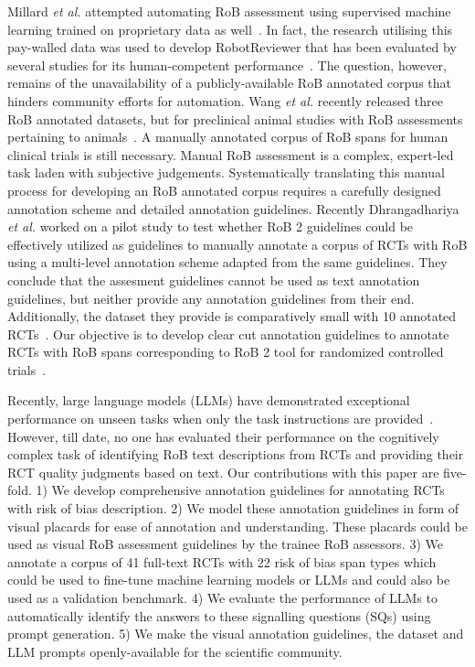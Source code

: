 \documentclass[sn-mathphys,Numbered]{sn-jnl}%
\theoremstyle{thmstyleone}%
\theoremstyle{thmstyletwo}%
\theoremstyle{thmstylethree}%
\begin{document}
Millard \textit{et al.} attempted automating RoB assessment using supervised machine learning trained on proprietary data as well~\cite{millard2016machine}.
In fact, the research utilising this pay-walled data was used to develop RobotReviewer that has been evaluated by several studies for its human-competent performance~\cite{marshall2016robotreviewer,soboczenski2019machine,vinkers2021methodological,jardim2022automating,hirt2021agreement}.
The question, however, remains of the unavailability of a publicly-available RoB annotated corpus that hinders community efforts for automation. 
Wang \textit{et al.} recently released three RoB annotated datasets, but for preclinical animal studies with RoB assessments pertaining to animals~\cite{wang2022risk}.
A manually annotated corpus of RoB spans for human clinical trials is still necessary.
Manual RoB assessment is a complex, expert-led task laden with subjective judgements.
Systematically translating this manual process for developing an RoB annotated corpus requires a carefully designed annotation scheme and detailed annotation guidelines.
Recently Dhrangadhariya \textit{et al.} worked on a pilot study to test whether RoB 2 guidelines could be effectively utilized as guidelines to manually annotate a corpus of RCTs with RoB using a multi-level annotation scheme adapted from the same guidelines.
They conclude that the assesment guidelines cannot be used as text annotation guidelines, but neither provide any annotation guidelines from their end.
Additionally, the dataset they provide is comparatively small with 10 annotated RCTs~\cite{dhrangadhariya2023first}.
Our objective is to develop clear cut annotation guidelines to annotate RCTs with RoB spans corresponding to RoB 2 tool for randomized controlled trials~\cite{sterne2019rob}.



Recently, large language models (LLMs) have demonstrated exceptional performance on unseen tasks when only the task instructions are provided~\cite{chang2023survey}.
However, till date, no one has evaluated their performance on the cognitively complex task of identifying RoB text descriptions from RCTs and providing their RCT quality judgments based on text.
Our contributions with this paper are five-fold. 
1) We develop comprehensive annotation guidelines for annotating RCTs with risk of bias description.
2) We model these annotation guidelines in form of visual placards for ease of annotation and understanding. These placards could be used as visual RoB assessment guidelines by the trainee RoB assessors.
3) We annotate a corpus of 41 full-text RCTs with 22 risk of bias span types which could be used to fine-tune machine learning models or LLMs and could also be used as a validation benchmark.
4) We evaluate the performance of LLMs to automatically identify the answers to these signalling questions (SQs) using prompt generation.
5) We make the visual annotation guidelines, the dataset and LLM prompts openly-available for the scientific community.
%
%
%
\end{document}

